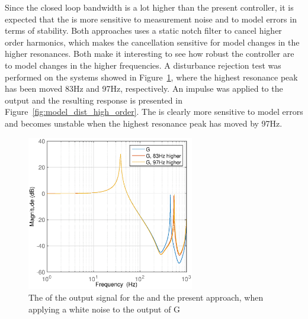 Since the \abbrIRC closed loop bandwidth is a lot higher than the present controller, it is expected that the \abbrIRC is more sensitive to measurement noise and to model errors in terms of stability. Both approaches uses a static notch filter to cancel higher order harmonics, which makes the cancellation sensitive for model changes in the higher resonances. Both make it interesting to see how robust the controller are to model changes in the higher frequencies. A disturbance rejection test was performed on the systems showed in Figure~\ref{fig:high_model_error}, where the highest resonance peak has been moved 83Hz and 97Hz, respectively. An impulse was applied to the output and the resulting response is presented in Figure~\ref{fig:model_dist_high_order}. The \abbrIRC is clearly more sensitive to model errors and becomes unstable when the highest resonance peak has moved by 97Hz.

\begin{figure}[h!]
  \centering
  \includegraphics[width=0.65\textwidth]{fig/matlab/bode_high_model_error.eps}
  \caption{\label{fig:high_model_error} The \abbrFFT of the output signal for the \abbrIRC and the present approach, when applying a white noise to the output of G}
\end{figure}

